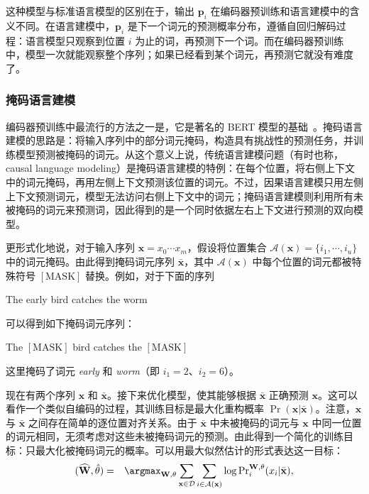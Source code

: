 这种模型与标准语言模型的区别在于，输出 $\mathbf{p}_i$ 在编码器预训练和语言建模中的含义不同。在语言建模中，$\mathbf{p}_i$ 是下一个词元的预测概率分布，遵循自回归解码过程：语言模型只观察到位置 $i$ 为止的词，再预测下一个词。而在编码器预训练中，模型一次就能观察整个序列；如果已经看到某个词元，再预测它就没有难度了。

\subsubsection{掩码语言建模}

\noindent 编码器预训练中最流行的方法之一是，它是著名的 BERT 模型的基础~\cite{devlin-etal:2019bert}。掩码语言建模的思路是：将输入序列中的部分词元掩码，构造具有挑战性的预测任务，并训练模型预测被掩码的词元。从这个意义上说，传统语言建模问题（有时也称，causal language modeling）是掩码语言建模的特例：在每个位置，将右侧上下文中的词元掩码，再用左侧上下文预测该位置的词元。不过，因果语言建模只用左侧上下文预测词元，模型无法访问右侧上下文中的词元；掩码语言建模则利用所有未被掩码的词元来预测词，因此得到的是一个同时依据左右上下文进行预测的双向模型。

更形式化地说，对于输入序列 $\mathbf{x}=x_0\cdots x_m$，假设将位置集合 $\mathcal{A}(\mathbf{x}) = \{i_1,\cdots,i_{u}\}$ 中的词元掩码。由此得到掩码词元序列 $\bar{\mathbf{x}}$，其中 $\mathcal{A}(\mathbf{x})$ 中每个位置的词元都被特殊符号 $[\mathrm{MASK}]$ 替换。例如，对于下面的序列

\vspace{0.5em}
\begin{center}
The early bird catches the worm
\end{center}
\vspace{0.5em}

\noindent 可以得到如下掩码词元序列：

\vspace{0.5em}
\begin{center}
The $[\mathrm{MASK}]$ bird catches the $[\mathrm{MASK}]$
\end{center}
\vspace{0.5em}

\noindent 这里掩码了词元 \textit{early} 和 \textit{worm}（即 $i_1 = 2$、$i_2 = 6$）。

现在有两个序列 $\mathbf{x}$ 和 $\bar{\mathbf{x}}$。接下来优化模型，使其能够根据 $\bar{\mathbf{x}}$ 正确预测 $\mathbf{x}$。这可以看作一个类似自编码的过程，其训练目标是最大化重构概率 $\Pr(\mathbf{x}|\bar{\mathbf{x}})$。注意，$\mathbf{x}$ 与 $\bar{\mathbf{x}}$ 之间存在简单的逐位置对齐关系。由于 $\bar{\mathbf{x}}$ 中未被掩码的词元与 $\mathbf{x}$ 中同一位置的词元相同，无须考虑对这些未被掩码词元的预测。由此得到一个简化的训练目标：只最大化被掩码词元的概率。可以用最大似然估计的形式表达这一目标：
\begin{eqnarray}
(\widehat{\mathbf{W}},\hat{\theta}) & = & \argmax_{\mathbf{W},\theta} \sum_{\mathbf{x} \in \mathcal{D}} \sum_{i \in \mathcal{A}(\mathbf{x})} \log \mathrm{Pr}_{i}^{\mathbf{W},\theta}(x_{i}|\bar{\mathbf{x}}),
\end{eqnarray}

